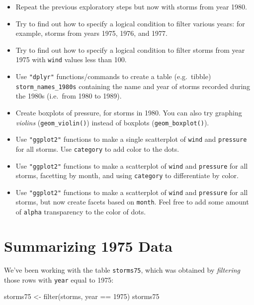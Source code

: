 \documentclass[
]{book}
\newenvironment{Shaded}{\begin{snugshade}}{\end{snugshade}}
\newcommand{\DecValTok}[1]{\textcolor[rgb]{0.00,0.00,0.81}{#1}}
\newcommand{\FunctionTok}[1]{\textcolor[rgb]{0.00,0.00,0.00}{#1}}
\newcommand{\NormalTok}[1]{#1}
\newcommand{\OtherTok}[1]{\textcolor[rgb]{0.56,0.35,0.01}{#1}}
\newcommand{\SpecialCharTok}[1]{\textcolor[rgb]{0.00,0.00,0.00}{#1}}
\begin{document}
\begin{itemize}
\item
  Repeat the previous exploratory steps but now with storms from year 1980.
\item
  Try to find out how to specify a logical condition to filter various years:
  for example, storms from years 1975, 1976, and 1977.
\item
  Try to find out how to specify a logical condition to filter storms from
  year 1975 with \texttt{wind} values less than 100.
\item
  Use \texttt{"dplyr"} functions/commands to create a table (e.g.~tibble)
  \texttt{storm\_names\_1980s} containing the name and year of storms recorded during the
  1980s (i.e.~from 1980 to 1989).
\item
  Create boxplots of pressure, for storms in 1980. You can also try
  graphing \emph{violins} (\texttt{geom\_violin()}) instead of boxplots (\texttt{geom\_boxplot()}).
\item
  Use \texttt{"ggplot2"} functions to make a single scatterplot of \texttt{wind} and
  \texttt{pressure} for all storms. Use \texttt{category} to add color to the dots.
\item
  Use \texttt{"ggplot2"} functions to make a scatterplot of \texttt{wind} and \texttt{pressure}
  for all storms, facetting by month, and using \texttt{category} to differentiate by
  color.
\item
  Use \texttt{"ggplot2"} functions to make a scatterplot of \texttt{wind} and \texttt{pressure}
  for all storms, but now create facets based on \texttt{month}. Feel free to add
  some amount of \texttt{alpha} transparency to the color of dots.
\end{itemize}

\hypertarget{summarizing-1975-data}{%
\chapter{Summarizing 1975 Data}\label{summarizing-1975-data}}

We've been working with the table \texttt{storms75}, which was obtained by \emph{filtering}
those rows with \texttt{year} equal to 1975:

\begin{Shaded}
\begin{Highlighting}[]
\NormalTok{storms75 }\OtherTok{\textless{}{-}} \FunctionTok{filter}\NormalTok{(storms, year }\SpecialCharTok{==} \DecValTok{1975}\NormalTok{)}
\NormalTok{storms75}
\end{Highlighting}
\end{Shaded}
\end{document}
